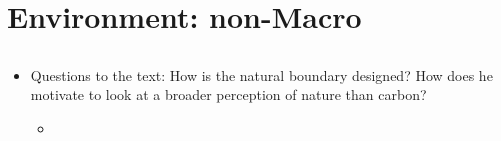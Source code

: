 \documentclass[12pt]{article}
\begin{document}
\section{Environment: non-Macro}
\subsection{\cite{Dasgupta2021}}
\begin{itemize}
\item Questions to the text: How is the natural boundary designed? How does he motivate to look at a broader perception of nature than carbon?
\begin{itemize}
\item
\end{itemize}
\end{itemize}
\clearpage

\end{document}
